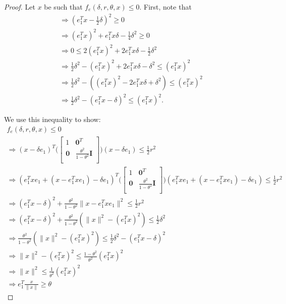 \begin{proof}
Let $x$ be such that $f_e(\delta, r, \theta, x) \le 0$.
First, note that
\begin{align*}
\Longrightarrow (e_1^Tx - \frac 1 2 \delta )^2\ge 0\\
\Longrightarrow (e_1^Tx)^2 + e_1^Tx\delta  - \frac 1 4 \delta^2 \ge 0\\
\Longrightarrow 0 \le 2(e_1^Tx)^2 + 2e_1^Tx\delta  - \frac 1 2 \delta^2\\
\Longrightarrow \frac 1 2 \delta^2 - (e_1^Tx)^2 + 2e_1^Tx\delta - \delta^2 \le (e_1^Tx)^2 \\
\Longrightarrow \frac 1 2 \delta^2 - \left((e_1^Tx)^2 - 2e_1^Tx\delta + \delta^2\right) \le (e_1^Tx)^2 \\
\Longrightarrow \frac 1 2 \delta^2 - (e_1^Tx - \delta)^2 \le (e_1^Tx)^2.
\end{align*}

We use this inequality to show:
\begin{align*}
f_e(\delta, r, \theta, x) \le 0 \\
\Longrightarrow (x - \delta e_1)^T\bigg(\begin{bmatrix}
1 & \boldsymbol0^T \\
\boldsymbol 0 & \frac{\theta^2}{1 - \theta^2} \boldsymbol I \\
\end{bmatrix}\bigg)(x - \delta e_1) \le \frac 1 2 r^2 \\
\Longrightarrow (e_1^Txe_1 + (x - e_1^Txe_1) - \delta e_1)^T\bigg(\begin{bmatrix}
1 & \boldsymbol0^T \\
\boldsymbol 0 & \frac{\theta^2}{1 - \theta^2} \boldsymbol I \\
\end{bmatrix}\bigg)(e_1^Txe_1 + (x - e_1^Txe_1) - \delta e_1) \le \frac 1 2 r^2 \\
\Longrightarrow
(e_1^Tx - \delta)^2 + \frac{\theta^2}{1 - \theta^2}\|x - e_1^Tx e_1\|^2 \le \frac 1 2 r^2 \\
\Longrightarrow
(e_1^Tx - \delta)^2 + \frac{\theta^2}{1 - \theta^2}(\|x\|^2 - (e_1^Tx)^2) \le \frac 1 2 \delta^2 \\
\Longrightarrow\frac{\theta^2}{1 - \theta^2}(\|x\|^2 - (e_1^Tx)^2) \le \frac 1 2 \delta^2 - (e_1^Tx - \delta)^2\\
\Longrightarrow\|x\|^2 - (e_1^Tx)^2 \le \frac{1 - \theta^2}{\theta^2}(e_1^Tx)^2 \\
\Longrightarrow\|x\|^2 \le \frac 1 {\theta^2}(e_1^Tx)^2 \\
\Longrightarrow e_1^T\frac{x}{\|x\|} \ge \theta
\end{align*}
\end{proof}

